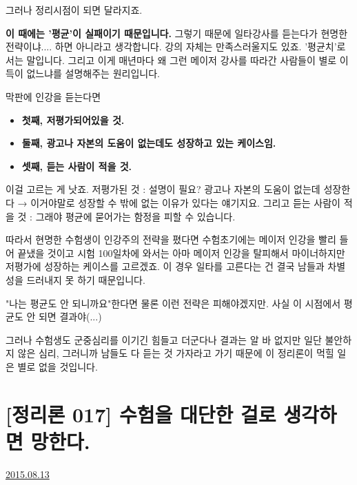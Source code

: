 그러나 정리시점이 되면 달라지죠.
\vspace{5mm}

\textbf{이 때에는 '평균'이 실패이기 때문입니다.}
그렇기 때문에 일타강사를 듣는다가 현명한 전략이냐.... 하면 아니라고 생각합니다.
강의 자체는 만족스러울지도 있죠. '평균치'로서는 말입니다.
그리고 이게 매년마다 왜 그런 메이저 강사를 따라간 사람들이 별로 이득이 없느냐를 설명해주는 원리입니다.
\vspace{5mm}

막판에 인강을 듣는다면
\begin{itemize}
    \item \textbf{첫째, 저평가되어있을 것.}
    \item \textbf{둘째, 광고나 자본의 도움이 없는데도 성장하고 있는  케이스임.}
    \item \textbf{셋째, 듣는 사람이 적을 것.}
\end{itemize}
\vspace{5mm}

이걸 고르는 게 낫죠.
저평가된 것 : 설명이 필요?
광고나 자본의 도움이 없는데 성장한다 → 이거야말로 성장할 수 밖에 없는 이유가 있다는 얘기지요.
그리고 듣는 사람이 적을 것 : 그래야 평균에 묻어가는 함정을 피할 수 있습니다.
\vspace{5mm}

따라서 현명한 수험생이 인강주의 전략을 폈다면
수험초기에는 메이저 인강을 빨리 들어 끝냈을 것이고
시험 100일차에 와서는 아마 메이저 인강을 탈피해서 마이너하지만 저평가에 성장하는 케이스를 고르겠죠.
이 경우 일타를 고른다는 건 결국 남들과 차별성을 드러내지 못 하기 때문입니다.
\vspace{5mm}

"나는 평균도 안 되니까요"한다면 물론 이런 전략은 피해야겠지만. 사실 이 시점에서 평균도 안 되면 결과야(...)
\vspace{5mm}

그러나 수험생도 군중심리를 이기긴 힘들고
더군다나 결과는 알 바 없지만 일단 불안하지 않은 심리, 그러니까 남들도 다 듣는 것 가자라고 가기 때문에
이 정리론이 먹힐 일은 별로 없을 것입니다.
\vspace{5mm}






\section{[정리론 017] 수험을 대단한 걸로 생각하면 망한다.}
\href{https://www.kockoc.com/Apoc/250805}{2015.08.13}

\vspace{5mm}

